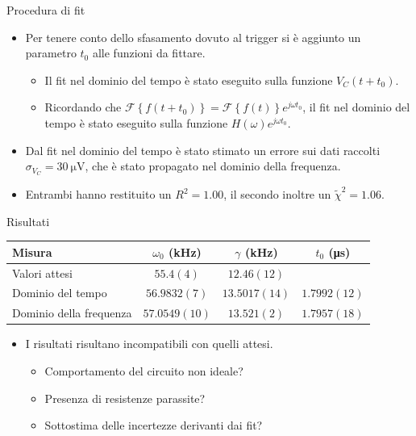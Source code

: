 \documentclass[11pt, xcolor=dvipsnames, aspectratio=43]{beamer}
\newcommand{\fourier}[1]{\mathcal{F}\left\{#1\right\}}
\begin{document}
\begin{frame}{Procedura di fit}
\begin{itemize}[<+->]
\item Per tenere conto dello \alert{sfasamento} dovuto al trigger si è aggiunto un parametro $t_0$ alle funzioni da fittare.
\begin{itemize}
\item Il fit nel dominio del tempo è stato eseguito sulla funzione $V_C(t+t_0)$.
\item Ricordando che $\fourier{f(t+t_0)} =  \fourier{f(t)} e^{j\omega t_0}$, il fit nel dominio del tempo è stato eseguito sulla funzione $ H(\omega) e^{j\omega t_0}$.
\end{itemize}

\item Dal fit nel dominio del tempo è stato stimato un errore sui dati raccolti \alert{$\sigma_{V_C} = \SI{30}{\micro\volt}$}, che è stato propagato nel dominio della frequenza.

\item Entrambi hanno restituito un $R^2 = 1.00$, il secondo inoltre un $\tilde{\chi}^2 = 1.06$.

\end{itemize}

\end{frame}

\begin{frame}{Risultati}
\begin{center}
\begin{tabular}{lccc}
\toprule
Misura & $\omega_0$ (\si{\kilo\hertz}) & $\gamma$ (\si{\kilo\hertz}) & $t_0$ (\si{\micro\second})\\
\midrule
Valori attesi & $55.4(4) $ & $12.46(12)$ & \\
Dominio del tempo & $56.9832(7)$ &  $13.5017(14)$ & $1.7992(12)$ \\
Dominio della frequenza & $57.0549(10)$ &  $13.521(2)$ & $1.7957(18)$\\
\bottomrule
\end{tabular}
\end{center}

\pause
\begin{itemize}
\item I risultati risultano \alert{incompatibili} con quelli attesi.
\begin{itemize}
\item Comportamento del circuito non ideale?
\item Presenza di resistenze parassite?
\item Sottostima delle incertezze derivanti dai fit?
\end{itemize}
\end{itemize}
\end{frame}
\end{document}
